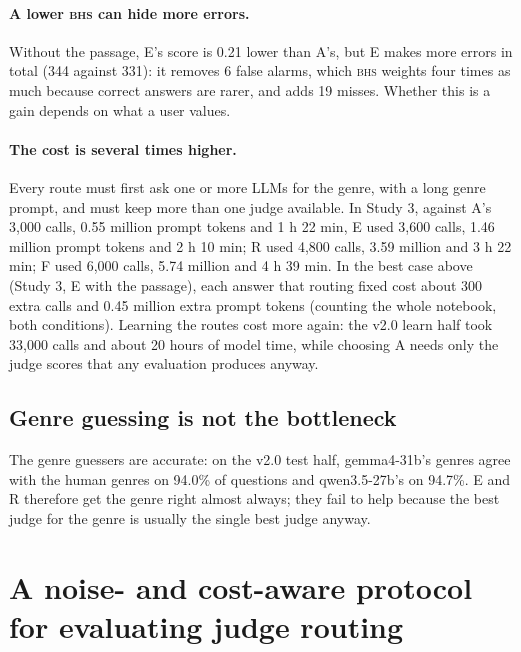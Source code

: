 \documentclass[pdflatex,sn-apa]{sn-jnl}
\newcommand{\BHS}{\textsc{bhs}}
\begin{document}
\paragraph{A lower \BHS{} can hide more errors.} Without the passage, E's score is 0.21 lower than A's, but E makes
more errors in total (344 against 331): it removes 6 false alarms, which \BHS{} weights four times as much because
correct answers are rarer, and adds 19 misses. Whether this is a gain depends on what a user values.

\paragraph{The cost is several times higher.} Every route must first ask one or more LLMs for the genre, with a long
genre prompt, and must keep more than one judge available. In Study 3, against A's 3,000 calls, 0.55 million prompt
tokens and 1 h 22 min, E used 3,600 calls, 1.46 million prompt tokens and 2 h 10 min; R used 4,800 calls, 3.59 million
and 3 h 22 min; F used 6,000 calls, 5.74 million and 4 h 39 min. In the best case above (Study 3, E with the passage),
each answer that routing fixed cost about 300 extra calls and 0.45 million extra prompt tokens (counting the
whole notebook, both conditions). Learning the routes
cost more again: the v2.0 learn half took 33,000 calls and about 20 hours of model time, while choosing A needs only
the judge scores that any evaluation produces anyway.

\subsection{Genre guessing is not the bottleneck}

The genre guessers are accurate: on the v2.0 test half, gemma4-31b's genres agree with the human genres on 94.0\% of
questions and qwen3.5-27b's on 94.7\%. E and R therefore get the genre right almost always; they fail to help because
the best judge for the genre is usually the single best judge anyway.

\section{A noise- and cost-aware protocol for evaluating judge routing}\label{sec:protocol}
\end{document}
